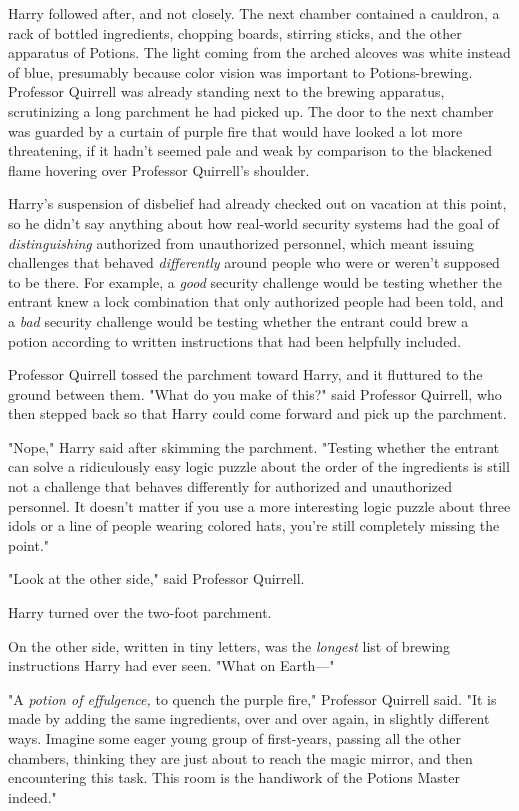 Harry followed after, and not closely.
\sbreak
The next chamber contained a cauldron, a rack of bottled ingredients, chopping 
boards, stirring sticks, and the other apparatus of Potions. The light coming 
from the arched alcoves was white instead of blue, presumably because color 
vision was important to Potions-brewing. Professor Quirrell was already 
standing next to the brewing apparatus, scrutinizing a long parchment he had 
picked up. The door to the next chamber was guarded by a curtain of purple fire 
that would have looked a lot more threatening, if it hadn't seemed pale and 
weak by comparison to the blackened flame hovering over Professor Quirrell's 
shoulder.

Harry's suspension of disbelief had already checked out on vacation at this 
point, so he didn't say anything about how real-world security systems had the 
goal of \emph{distinguishing} authorized from unauthorized personnel, which 
meant issuing challenges that behaved \emph{differently} around people who were 
or weren't supposed to be there. For example, a \emph{good} security challenge 
would be testing whether the entrant knew a lock combination that only 
authorized people had been told, and a \emph{bad} security challenge would be 
testing whether the entrant could brew a potion according to written 
instructions that had been helpfully included.

Professor Quirrell tossed the parchment toward Harry, and it fluttured to the 
ground between them. "What do you make of this?" said Professor Quirrell, who 
then stepped back so that Harry could come forward and pick up the parchment.

"Nope," Harry said after skimming the parchment. "Testing whether the entrant 
can solve a ridiculously easy logic puzzle about the order of the ingredients 
is still not a challenge that behaves differently for authorized and 
unauthorized personnel. It doesn't matter if you use a more interesting logic 
puzzle about three idols or a line of people wearing colored hats, you're still 
completely missing the point."

"Look at the other side," said Professor Quirrell.

Harry turned over the two-foot parchment.

On the other side, written in tiny letters, was the \emph{longest} list of 
brewing instructions Harry had ever seen. "What on Earth---"

"A \emph{potion of effulgence,} to quench the purple fire," Professor Quirrell 
said. "It is made by adding the same ingredients, over and over again, in 
slightly different ways. Imagine some eager young group of first-years, passing 
all the other chambers, thinking they are just about to reach the magic mirror, 
and then encountering this task. This room is the handiwork of the Potions 
Master indeed."

